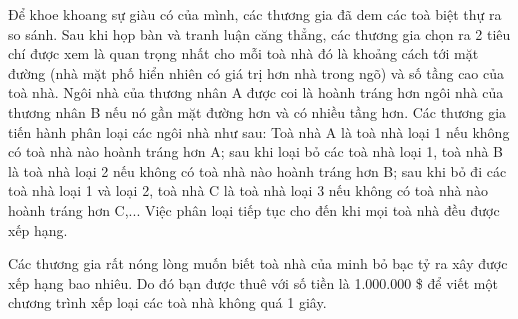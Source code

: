 Để khoe khoang sự giàu có của mình, các thương gia đã dem các toà biệt thự ra so sánh. Sau khi họp bàn và tranh luận căng thẳng, các thương gia chọn ra 2 tiêu chí được xem là quan trọng nhất cho mỗi toà nhà đó là khoảng cách tới mặt đường (nhà mặt phố hiển nhiên có giá trị hơn nhà trong ngõ) và số tầng cao của toà nhà. Ngôi nhà của thương nhân A được coi là hoành tráng hơn ngôi nhà của thương nhân B nếu nó gần mặt đường hơn và có nhiều tầng hơn. Các thương gia tiến hành phân loại các ngôi nhà như sau: Toà nhà A là toà nhà loại 1 nếu không có toà nhà nào hoành tráng hơn A; sau khi loại bỏ các toà nhà loại 1, toà nhà B là toà nhà loại 2 nếu không có toà nhà nào hoành tráng hơn B; sau khi bỏ đi các toà nhà loại 1 và loại 2, toà nhà C là toà nhà loại 3 nếu không có toà nhà nào hoành tráng hơn C,... Việc phân loại tiếp tục cho đến khi mọi toà nhà đều được xếp hạng.

Các thương gia rất nóng lòng muốn biết toà nhà của minh bỏ bạc tỷ ra xây được xếp hạng bao nhiêu. Do đó bạn được thuê với số tiền là 1.000.000 \$ để viết một chương trình xếp loại các toà nhà không quá 1 giây.